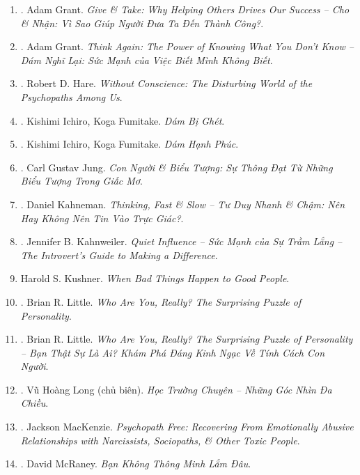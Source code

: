\documentclass{article}
\begin{document}
\begin{enumerate}
	\item \cite{Grant2022a}. Adam Grant. \textit{Give \& Take: Why Helping Others Drives Our Success -- Cho \& Nhận: Vì Sao Giúp Người Đưa Ta Đến Thành Công?}.\hfill{}
	\item \cite{Grant2022b}. Adam Grant. \textit{Think Again: The Power of Knowing What You Don't Know -- Dám Nghĩ Lại: Sức Mạnh của Việc Biết Mình Không Biết}.\hfill{}
	\item \cite{Hare1999}. Robert D. Hare. \textit{Without Conscience: The Disturbing World of the Psychopaths Among Us}.\hfill{\sf[downloaded]}
	\item \cite{Ichiro_Fumitake2022a}. Kishimi Ichiro, Koga Fumitake. \textit{Dám Bị Ghét}.\hfill{}
	\item \cite{Ichiro_Fumitake2022b}. Kishimi Ichiro, Koga Fumitake. \textit{Dám Hạnh Phúc}.\hfill{}
	\item \cite{Jung2022}. Carl Gustav Jung. \textit{Con Người \& Biểu Tượng: Sự Thông Đạt Từ Những Biểu Tượng Trong Giấc Mơ}.\hfill{\sf[bought]}
	\item \cite{Kahneman2022}. Daniel Kahneman. \textit{Thinking, Fast \& Slow -- Tư Duy Nhanh \& Chậm: Nên Hay Không Nên Tin Vào Trực Giác?}.\\\mbox{}\hfill{\sf[bought]}
	\item \cite{Kahnweiler2022}. Jennifer B. Kahnweiler. \textit{Quiet Influence -- Sức Mạnh của Sự Trầm Lắng -- The Introvert's Guide to Making a Difference}.\hfill{}
	\item Harold S. Kushner. \textit{When Bad Things Happen to Good People}.
	\item \cite{Little2017}. Brian R. Little. \textit{Who Are You, Really? The Surprising Puzzle of Personality}.\hfill{}
	\item \cite{Little2023}. Brian R. Little. \textit{Who Are You, Really? The Surprising Puzzle of Personality -- Bạn Thật Sự Là Ai? Khám Phá Đáng Kinh Ngạc Về Tính Cách Con Người}.\hfill{}
	\item \cite{Long_2021}. Vũ Hoàng Long (chủ biên). \textit{Học Trường Chuyên -- Những Góc Nhìn Đa Chiều}.\hfill{}
	\item \cite{MacKenzie2015}. Jackson MacKenzie. \textit{Psychopath Free: Recovering From Emotionally Abusive Relationships with Narcissists, Sociopaths, \& Other Toxic People}.\hfill{}
	\item \cite{McRaney2022a}. David McRaney. \textit{Bạn Không Thông Minh Lắm Đâu}.\hfill{}

\end{enumerate}
\end{document}
